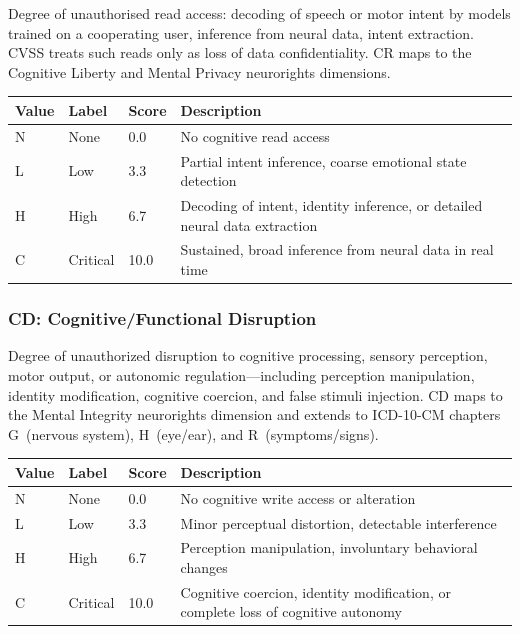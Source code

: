Degree of unauthorised read access: decoding of speech or motor intent by models trained
on a cooperating user, inference from neural data, intent extraction. CVSS treats such
reads only as loss of data confidentiality. CR maps to the Cognitive Liberty and Mental
Privacy neurorights dimensions.

\begin{table}[H]
\centering
\small
\begin{tabular}{@{}l l l p{7cm}@{}}
\toprule
\textbf{Value} & \textbf{Label} & \textbf{Score} & \textbf{Description} \\
\midrule
N & None     & 0.0  & No cognitive read access \\
L & Low      & 3.3  & Partial intent inference, coarse emotional state detection \\
H & High     & 6.7  & Decoding of intent, identity inference, or detailed neural data extraction \\
C & Critical & 10.0 & Sustained, broad inference from neural data in real time \\
\bottomrule
\end{tabular}
\end{table}

\subsubsection{CD: Cognitive/Functional Disruption}

Degree of unauthorized disruption to cognitive processing, sensory perception,
motor output, or autonomic regulation---including perception manipulation,
identity modification, cognitive coercion, and false stimuli injection. CD maps
to the Mental Integrity neurorights dimension and extends to ICD-10-CM chapters
G~(nervous system), H~(eye/ear), and R~(symptoms/signs).

\begin{table}[H]
\centering
\small
\begin{tabular}{@{}l l l p{7cm}@{}}
\toprule
\textbf{Value} & \textbf{Label} & \textbf{Score} & \textbf{Description} \\
\midrule
N & None     & 0.0  & No cognitive write access or alteration \\
L & Low      & 3.3  & Minor perceptual distortion, detectable interference \\
H & High     & 6.7  & Perception manipulation, involuntary behavioral changes \\
C & Critical & 10.0 & Cognitive coercion, identity modification, or complete loss of cognitive autonomy \\
\bottomrule
\end{tabular}
\end{table}

